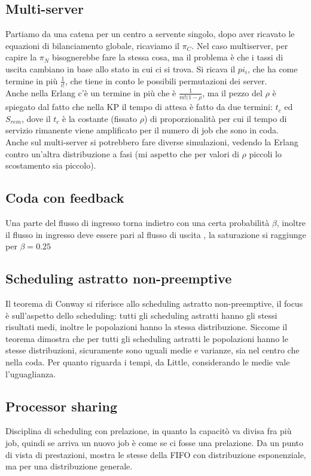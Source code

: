 \documentclass{article}
\begin{document}
\subsection{Multi-server}
Partiamo da una catena per un centro a servente singolo, dopo aver ricavato le equazioni di bilanciamento globale, ricaviamo il $\pi_C$. Nel caso multiserver, per capire la $\pi_N$ bisognerebbe fare la stessa cosa, ma il problema è che i tassi di uscita cambiano in base allo stato in cui ci si trova. Si ricava il $pi_i$, che ha come termine in più $\frac{1}{i!}$, che tiene in conto le possibili permutazioni dei server.\\ Anche nella Erlang c'è un termine in più che è $\frac{1}{m! (1 - \rho}$, ma il pezzo del $\rho$ è spiegato dal fatto che nella KP il tempo di attesa è fatto da due termini: $t_c$ ed $S_{rem}$, dove il $t_c$ è la costante (fissato $\rho$) di proporzionalità per cui il tempo di servizio rimanente viene amplificato per il numero di job che sono in coda.\\ Anche sul multi-server si potrebbero fare diverse simulazioni, vedendo la Erlang contro un'altra distribuzione a fasi (mi aspetto che per valori di $\rho$ piccoli lo scostamento sia piccolo).
\subsection{Coda con feedback}
Una parte del flusso di ingresso torna indietro con una certa probabilità $\beta$, inoltre il flusso in ingresso deve essere pari al flusso di uscita , la saturazione si raggiunge per $\beta = 0.25$
\subsection{Scheduling astratto non-preemptive}
Il teorema di Conway si riferisce allo scheduling astratto non-preemptive, il focus è sull'aspetto dello scheduling: tutti gli scheduling astratti hanno gli stessi risultati medi, inoltre le popolazioni hanno la stessa distribuzione. Siccome il teorema dimostra che per tutti gli scheduling astratti le popolazioni hanno le stesse distribuzioni, sicuramente sono uguali medie e varianze, sia nel centro che nella coda. Per quanto riguarda i tempi, da Little, considerando le medie vale l'uguaglianza.
\subsection{Processor sharing}
Disciplina di scheduling con prelazione, in quanto la capacitò va divisa fra più job, quindi se arriva un nuovo job è come se ci fosse una prelazione. Da un punto di vista di prestazioni, mostra le stesse della FIFO con distribuzione esponenziale, ma per una distribuzione generale.
\end{document}
